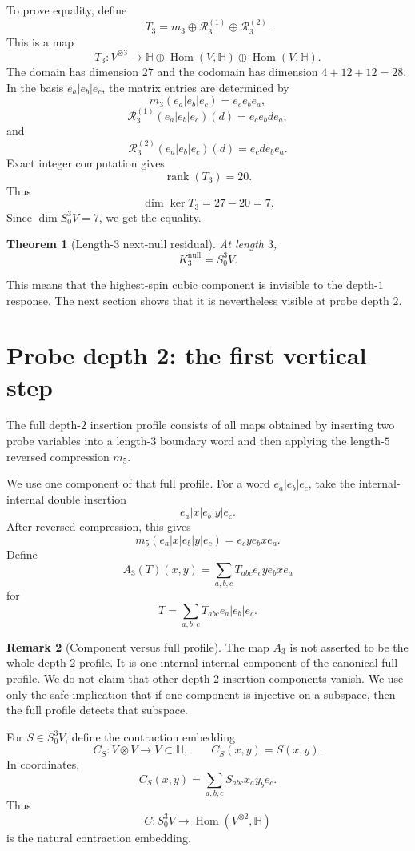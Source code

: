 \documentclass[11pt]{article}
\newtheorem{theorem}{Theorem}[section]
\theoremstyle{definition}
\newtheorem{remark}[theorem]{Remark}
\newcommand{\Ker}{\operatorname{ker}}
\newcommand{\rank}{\operatorname{rank}}
\newcommand{\Hom}{\operatorname{Hom}}
\begin{document}
To prove equality, define
\[
  T_3=m_3\oplus\mathcal{R}_3^{(1)}\oplus\mathcal{R}_3^{(2)}.
\]
This is a map
\[
  T_3:V^{\otimes3}\to
  \mathbb{H}\oplus\Hom(V,\mathbb{H})\oplus\Hom(V,\mathbb{H}).
\]
The domain has dimension $27$ and the codomain has dimension $4+12+12=28$.
In the basis $e_a|e_b|e_c$, the matrix entries are determined by
\[
  m_3(e_a|e_b|e_c)=e_ce_be_a,
\]
\[
  \mathcal{R}_3^{(1)}(e_a|e_b|e_c)(d)=e_ce_bde_a,
\]
and
\[
  \mathcal{R}_3^{(2)}(e_a|e_b|e_c)(d)=e_cde_be_a.
\]
Exact integer computation gives
\[
  \rank(T_3)=20.
\]
Thus
\[
  \dim\Ker T_3=27-20=7.
\]
Since $\dim S^3_0V=7$, we get the equality.

\begin{theorem}[Length-3 next-null residual]
\label{thm:k3null}
At length $3$,
\[
  K_3^{\mathrm{null}}=S^3_0V.
\]
\end{theorem}

This means that the highest-spin cubic component is invisible to the depth-$1$ response.
The next section shows that it is nevertheless visible at probe depth $2$.

\section{Probe depth 2: the first vertical step}

The full depth-$2$ insertion profile consists of all maps obtained by inserting two probe variables into a length-$3$ boundary word and then applying the length-$5$ reversed compression $m_5$.

We use one component of that full profile.
For a word $e_a|e_b|e_c$, take the internal-internal double insertion
\[
  e_a|x|e_b|y|e_c.
\]
After reversed compression, this gives
\[
  m_5(e_a|x|e_b|y|e_c)=e_cye_bxe_a.
\]
Define
\[
  A_3(T)(x,y)=\sum_{a,b,c}T_{abc}e_cye_bxe_a
\]
for
\[
  T=\sum_{a,b,c}T_{abc}e_a|e_b|e_c.
\]

\begin{remark}[Component versus full profile]
The map $A_3$ is not asserted to be the whole depth-$2$ profile.
It is one internal-internal component of the canonical full profile.
We do not claim that other depth-$2$ insertion components vanish.
We use only the safe implication that if one component is injective on a subspace, then the full profile detects that subspace.
\end{remark}

For $S\in S^3_0V$, define the contraction embedding
\[
  C_S:V\otimes V\to V\subset\mathbb{H},
  \qquad
  C_S(x,y)=S(x,y).
\]
In coordinates,
\[
  C_S(x,y)=\sum_{a,b,c}S_{abc}x_ay_be_c.
\]
Thus
\[
  C:S^3_0V\to\Hom(V^{\otimes2},\mathbb{H})
\]
is the natural contraction embedding.
\end{document}
